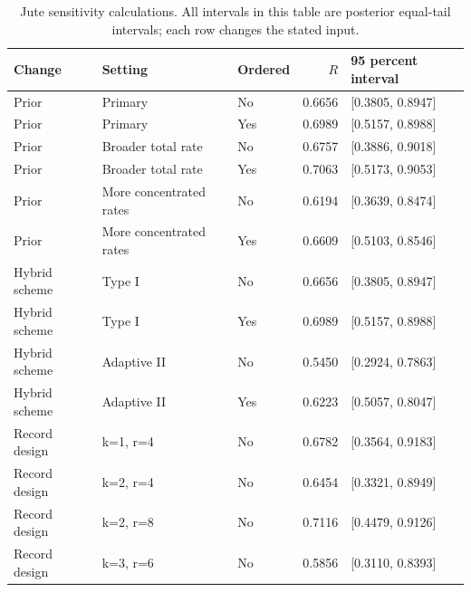 \begin{table}[htbp]
\centering
\caption{Jute sensitivity calculations. All intervals in this table are posterior equal-tail intervals; each row changes the stated input.}\label{tab:sensitivity}
\small
\begin{tabular}{lllrl}
\toprule
Change & Setting & Ordered & $R$ & 95 percent interval \\
\midrule
Prior & Primary & No & 0.6656 & [0.3805, 0.8947] \\
Prior & Primary & Yes & 0.6989 & [0.5157, 0.8988] \\
Prior & Broader total rate & No & 0.6757 & [0.3886, 0.9018] \\
Prior & Broader total rate & Yes & 0.7063 & [0.5173, 0.9053] \\
Prior & More concentrated rates & No & 0.6194 & [0.3639, 0.8474] \\
Prior & More concentrated rates & Yes & 0.6609 & [0.5103, 0.8546] \\
Hybrid scheme & Type I & No & 0.6656 & [0.3805, 0.8947] \\
Hybrid scheme & Type I & Yes & 0.6989 & [0.5157, 0.8988] \\
Hybrid scheme & Adaptive II & No & 0.5450 & [0.2924, 0.7863] \\
Hybrid scheme & Adaptive II & Yes & 0.6223 & [0.5057, 0.8047] \\
Record design & k=1, r=4 & No & 0.6782 & [0.3564, 0.9183] \\
Record design & k=2, r=4 & No & 0.6454 & [0.3321, 0.8949] \\
Record design & k=2, r=8 & No & 0.7116 & [0.4479, 0.9126] \\
Record design & k=3, r=6 & No & 0.5856 & [0.3110, 0.8393] \\
\bottomrule
\end{tabular}
\end{table}
